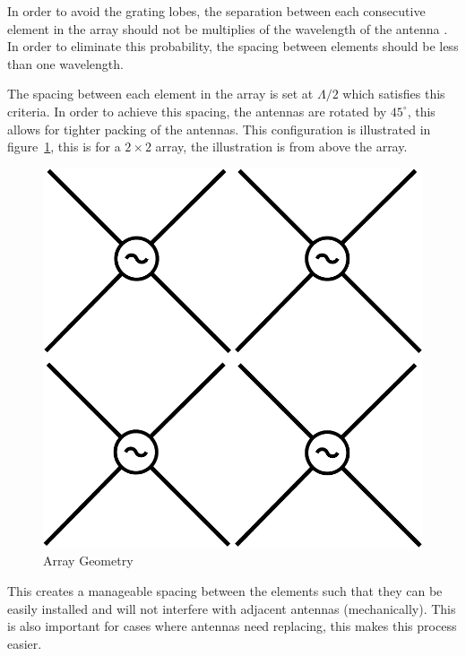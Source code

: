 \documentclass[11pt]{witseiepaper}
\begin{document}
In order to avoid the grating lobes, the separation between each consecutive element in the array should not be multiplies of the wavelength of the antenna \cite[p.~297]{Balanis}.
In order to eliminate this probability, the spacing between elements should be less than one wavelength.



The spacing between each element in the array is set at $\Lambda/2$ which satisfies this criteria.
In order to achieve this spacing, the antennas are rotated by $45^{\circ}$, this allows for tighter packing of the antennas. This configuration is illustrated in figure~\ref{fig:ArrayGeometry}, this is for a $2 \times 2$ array, the illustration is from above the array.

\begin{center}
    \begin{figure}
        \includegraphics[width=\textwidth]{ArrayGeometry.pdf}
        \caption{Array Geometry}
        \label{fig:ArrayGeometry}    
    \end{figure}
\end{center}

This creates a manageable spacing between the elements such that they can be easily installed and will not interfere with adjacent antennas (mechanically). This is also important for cases where antennas need replacing, this makes this process easier.
\end{document}
